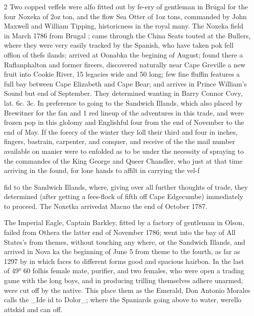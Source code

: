 \documentclass[10pt]{article}
\begin{document}
\begin{multicols}{2}
Two copped veffels were alfo fitted out by fe-ery of gentleman in Brugal for the four Noxeka of 2oz ton, and the flow Sea Otter of 1oz tons, commanded by John Maxwell and William Tipping, historicness in the royal many. The Noxeka field in March 1786 from Brugal ; came through the China Seats touted at the Bullers, where they were very easily tracked by the Spanish, who have taken pok fell offion of thefs ilands; arrived at Oonabka the begining of August; found there a Ruflanphalton and former fireers, discovered naturally near Cape Greville a new fruit into Cookie River, 15 legacies wide and 50 long; few fine fluffin features a full bay between Cape Elizabeth and Cape Bear; and arrives in Prince William's Sound but end of September. They determined wanting in Barry Connor Covy, lat. 6c. 3c. In preference to going to the Sandwich Illands, which also placed by Brewitner for the fan and 1 red lineup of the adventures in this trade, and were frozen pop in this glolomy and Englishful four from the end of November to the end of May. If the forecy of the winter they loll their third and four in inches, fingers, bastrain, carpenter, and conquer, and receive of the the mail number available on manier were to enfolded as to be under the necessity of spraying to the commandes of the King George and Queer Chandler, who just at that time arriving in the found, for lone hands to affilt in carrying the vel-f

fid to the Sandwich Illands, where, giving over all further thoughts of trade, they determined (after getting a fees-flock of fifth off Cape Edgecumbe) immediately to proceed. The Noxetka arrivedat Macno the end of October 1787.

The Imperial Eagle, Captain Barkley, fitted by a factory of gentleman in Olson, failed from Othera the latter end of November 1786; went into the bay of All States’s from themes, without touching any where, or the Sandwich Illands, and arrived in Nova ka the beginning of June 5 from theme to the fourth, as far as 1297 by in which faces to different forms good and spacious hairbon. In the last of 49° 60 folhis female mate, purifier, and two females, who were open a trading game with the long boys, and in producing trilling themselves adhere unarmed, were cut off by the native. This place them as the Emerald, Don Antonio Morales calls the \_Ide id to Dolor\_; where the Spaniards going above to water, werello attskid and can off.


\end{multicols}
\end{document}
